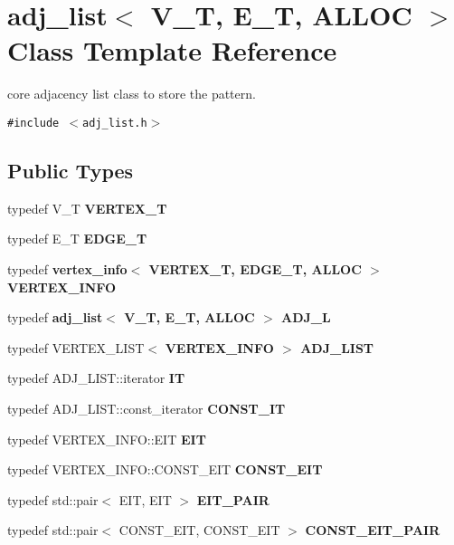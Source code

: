 \section{adj\_\-list$<$ V\_\-T, E\_\-T, ALLOC $>$ Class Template Reference}
\label{classadj__list}
core adjacency list class to store the pattern.  


{\tt \#include $<$adj\_\-list.h$>$}

\subsection*{Public Types}
\begin{CompactItemize}
\item 
typedef V\_\-T \textbf{VERTEX\_\-T}\label{classadj__list_857b9e471802fef6b408f94bd8c3172b}

\item 
typedef E\_\-T \textbf{EDGE\_\-T}\label{classadj__list_b437b16e1f56e663b865733aa39aea48}

\item 
typedef \bf{vertex\_\-info}$<$ VERTEX\_\-T, EDGE\_\-T, ALLOC $>$ \textbf{VERTEX\_\-INFO}\label{classadj__list_ed8fe3219d3d0a4d9c5cec8bbfadded2}

\item 
typedef \bf{adj\_\-list}$<$ V\_\-T, E\_\-T, ALLOC $>$ \textbf{ADJ\_\-L}\label{classadj__list_9641726e40aa02143b5e650e31e18396}

\item 
typedef VERTEX\_\-LIST$<$ \bf{VERTEX\_\-INFO} $>$ \textbf{ADJ\_\-LIST}\label{classadj__list_80e16fde02431080f218f4292d5e5710}

\item 
typedef ADJ\_\-LIST::iterator \textbf{IT}\label{classadj__list_361b6ad336e021a05e98a660e6b345f6}

\item 
typedef ADJ\_\-LIST::const\_\-iterator \textbf{CONST\_\-IT}\label{classadj__list_e0cc4c550fa07fdee8d151eae6921ae6}

\item 
typedef VERTEX\_\-INFO::EIT \textbf{EIT}\label{classadj__list_acdf05f119a4d88694ba4a3890aea5a8}

\item 
typedef VERTEX\_\-INFO::CONST\_\-EIT \textbf{CONST\_\-EIT}\label{classadj__list_0682ecda7c64328d18bcc46db9383845}

\item 
typedef std::pair$<$ EIT, EIT $>$ \textbf{EIT\_\-PAIR}\label{classadj__list_a11f5e85139411d34ae344ac0c9e29e8}

\item 
typedef std::pair$<$ CONST\_\-EIT, CONST\_\-EIT $>$ \textbf{CONST\_\-EIT\_\-PAIR}\label{classadj__list_f13e5e91a32350823fb00149f3782431}

\end{CompactItemize}
